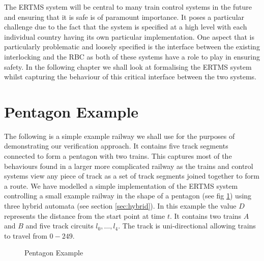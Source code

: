 \label{chap:hybrid}
The ERTMS system will be central to many train control systems in the future and ensuring that it is safe is of paramount importance. It poses a particular challenge due to the fact that the system is specified at a high level with each individual country having its own particular implementation. One aspect that is particularly problematic and loosely specified is the interface between the existing interlocking and the RBC as both of these systems have a role to play in ensuring safety. In the following chapter we shall look at formalising the ERTMS system whilst capturing the behaviour of this critical interface between the two systems. 
%
\section{Pentagon Example}
The following is a simple example railway we shall use for the purposes of demonstrating our verification approach.  It contains five track segments connected to form a pentagon with two trains. This captures most of the behaviours found in a larger more complicated railway as the trains and control systems view any piece of track as a set of track segments joined together to form a route. We have modelled  a simple implementation of the ERTMS system controlling  a small example railway in the shape of a pentagon (see fig \ref{fig:pentagon2}) using three hybrid automata (see section \ref{sec:hybrid}). In this example the value $D$ represents the distance from the start point at time $t$. It contains two trains $A$ and $B$ and five track circuits $l_0, \ldots , l_4$. The track is uni-directional allowing trains to travel from $0 - 249$. 
\medskip
%
\begin{figure} [h!]
\begin{center}
\end{center}

 \caption{Pentagon Example}
 \label{fig:pentagon2}
\end{figure}

